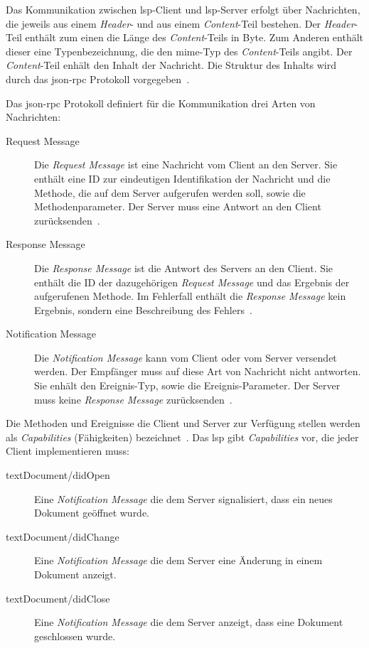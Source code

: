 Das Kommunikation zwischen \ac{lsp}-Client und \ac{lsp}-Server erfolgt über Nachrichten, die jeweils aus einem \textit{Header}- und aus einem \textit{Content}-Teil bestehen.
Der \textit{Header}-Teil enthält zum einen die Länge des \textit{Content}-Teils in Byte. Zum Anderen enthält dieser eine Typenbezeichnung,
die den \ac{mime}-Typ des \textit{Content}-Teils angibt. Der \textit{Content}-Teil enhält den Inhalt der Nachricht. Die Struktur des Inhalts wird durch
das \acs{json}-\acs{rpc} Protokoll vorgegeben~\cite{lsp-microsoft,lsp-medium}.

Das \acs{json}-\acs{rpc} Protokoll definiert für die Kommunikation drei Arten von Nachrichten:
\begin{description}
    \item[Request Message] Die \textit{Request Message} ist eine Nachricht vom Client an den Server.
          Sie enthält eine ID zur eindeutigen Identifikation der Nachricht und die Methode, die auf dem Server aufgerufen werden soll, sowie die Methodenparameter.
          Der Server muss eine Antwort an den Client zurücksenden~\cite{lsp-microsoft}.
    \item[Response Message] Die \textit{Response Message} ist die Antwort des Servers an den Client. Sie enthält die ID der dazugehörigen \textit{Request Message} und das Ergebnis der aufgerufenen Methode.
          Im Fehlerfall enthält die \textit{Response Message} kein Ergebnis, sondern eine Beschreibung des Fehlers~\cite{lsp-microsoft}.
    \item[Notification Message]  Die \textit{Notification Message} kann vom Client oder vom Server versendet werden.
          Der Empfänger muss auf diese Art von Nachricht nicht antworten.
          Sie enhält den Ereignis-Typ, sowie die Ereignis-Parameter. Der Server muss keine \textit{Response Message} zurücksenden~\cite{lsp-microsoft}.
\end{description}

Die Methoden und Ereignisse die Client und Server zur Verfügung stellen werden als \textit{Capabilities} (Fähigkeiten) bezeichnet~\cite{lsp-medium}.
Das \ac{lsp} gibt \textit{Capabilities} vor, die jeder Client implementieren muss:
\begin{description}
    \item[textDocument/didOpen] Eine \textit{Notification Message} die dem Server signalisiert, dass ein neues Dokument geöffnet wurde.
    \item[textDocument/didChange] Eine \textit{Notification Message} die dem Server eine Änderung in einem Dokument anzeigt.
    \item[textDocument/didClose]  Eine \textit{Notification Message} die dem Server anzeigt, dass eine Dokument geschlossen wurde.
\end{description}

